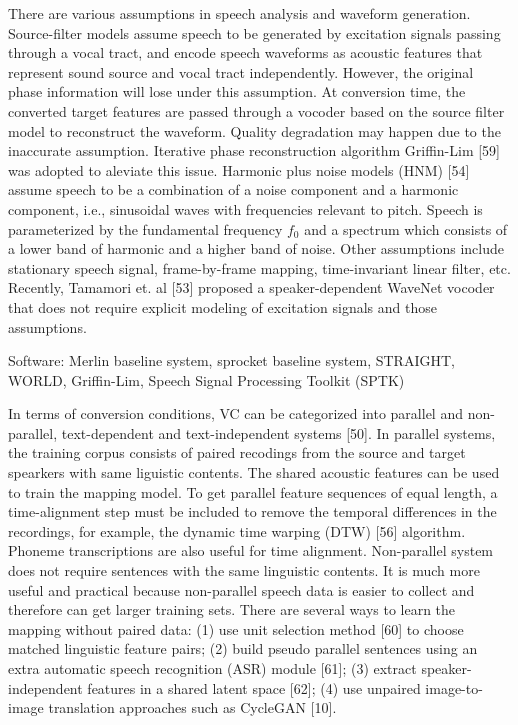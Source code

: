 \documentclass{article}
\begin{document}
There are various assumptions in speech analysis and waveform generation. Source-filter models assume speech to be generated by excitation signals passing through a vocal tract, and encode speech waveforms as acoustic features that represent sound source and vocal tract independently. However, the original phase information will lose under this assumption. At conversion time, the converted target features are passed through a vocoder based on the source filter model to reconstruct the waveform. Quality degradation may happen due to the inaccurate assumption. Iterative phase reconstruction algorithm Griffin-Lim [59] was adopted to aleviate this issue. Harmonic plus noise models (HNM) [54] assume speech to be a combination of a noise component and a harmonic component, i.e., sinusoidal waves with frequencies relevant to pitch. Speech is parameterized by the fundamental frequency $f_0$ and a spectrum which consists of a lower band of harmonic and a higher band of noise. Other assumptions include
stationary speech signal, %
frame-by-frame mapping, %
time-invariant linear filter, etc. Recently, Tamamori et. al [53] proposed a speaker-dependent WaveNet vocoder that does not require explicit modeling of excitation signals and those assumptions.

{\color{blue} Software: Merlin baseline system, sprocket baseline system, STRAIGHT, WORLD, Griffin-Lim, Speech Signal Processing Toolkit (SPTK)}

In terms of conversion conditions, VC can be categorized into parallel and non-parallel, text-dependent and text-independent systems [50]. In parallel systems, the training corpus consists of paired recodings from the source and target spearkers with same liguistic contents. The shared acoustic features can be used to train the mapping model. To get parallel feature sequences of equal length, a time-alignment step must be included to remove the temporal differences in the recordings, for example, the dynamic time warping (DTW) [56] algorithm. Phoneme transcriptions are also useful for time alignment. Non-parallel system does not require sentences with the same linguistic contents. It is much more useful and practical because non-parallel speech data is easier to collect and therefore can get larger training sets. There are several ways to learn the mapping without paired data: (1) use unit selection method [60] to choose matched linguistic feature pairs; (2) build pseudo parallel sentences using an extra automatic speech recognition (ASR) module [61]; (3) extract speaker-independent features in a shared latent space [62]; (4) use unpaired image-to-image translation approaches such as CycleGAN [10].
\end{document}

